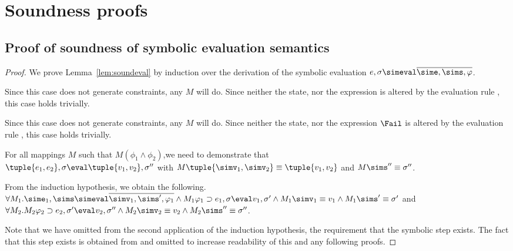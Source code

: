 


\section{Soundness proofs}
\label{sec:soundness-proofs}

\subsection{Proof of soundness of symbolic evaluation semantics}
\begin{proof}
  We prove Lemma~\ref{lem:soundeval} by induction over the derivation of the symbolic evaluation $e,\sigma\simeval\overline{\sime,\sims,\phi}$.

    {Since this case does not generate constraints, any $M$ will do.
    Since neither the state, nor the expression is altered by the evaluation rule ,
    this case holds trivially.
    }

      {Since this case does not generate constraints, any $M$ will do.
      Since neither the state, nor the expression $\Fail$ is altered by the evaluation rule ,
      this case holds trivially.
      }
    {For all mappings $M$ such that $M(\phi_1\wedge\phi_2)$,we need to demonstrate that\\
    $\tuple{e_1,e_2},\sigma\eval\tuple{v_1,v_2},\sigma''$ with
    $M\tuple{\simv_1,\simv_2} \equiv \tuple{v_1,v_2}$ and $M\sims''\equiv\sigma''$.

    From the induction hypothesis, we obtain the following.\\
    $\forall M_1 . \sime_1,\sims\simeval\overline{\simv_1,\sims',\phi_1}\land M_1\phi_1 \implies e_1,\sigma \eval v_1,\sigma'\land  M_1\simv_1\equiv v_1 \land  M_1\sims'\equiv\sigma'$ and\\
    $\forall M_2 . M_2\phi_2 \implies e_2, \sigma'\eval v_2,\sigma''\land M_2 \simv_2\equiv v_2\land M_2\sims''\equiv\sigma''$.

    Note that we have omitted from the second application of the induction hypothesis, the requirement that the symbolic step exists.
    The fact that this step exists is obtained from  and omitted to increase readability of this and any following proofs.

}
\end{proof}
